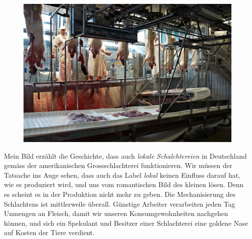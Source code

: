 \documentclass[a4paper,ngerman,11pt]{scrartcl}
\begin{document}
\noindent
\begin{figure}[htb]
\centering
\includegraphics[width=\textwidth]{Bilder/frommann_ronald_02-export.jpg}
\end{figure}

\noindent
Mein Bild erzählt die Geschichte, dass auch \emph{lokale Schalchtereien} in
Deutschland gemäss der amerikanischen Grossschlachterei funktionieren. Wir
müssen der Tatsache ins Auge sehen, dass auch das Label \emph{lokal} keinen Einfluss
darauf hat, wie es produziert wird, und uns vom romantischen Bild des kleinen
lösen. Denn es scheint es in der Produktion nicht mehr zu geben. Die
Mechanisierung des Schlachtens ist mittlerweile überall. Günstige Arbeiter
verarbeiten jeden Tag Unmengen an Fleisch, damit wir unseren Konsumgewohnheiten
nachgehen können, und sich ein Spekulant und Besitzer einer Schlachterei eine
goldene Nase auf Kosten der Tiere verdient.



\end{document}
